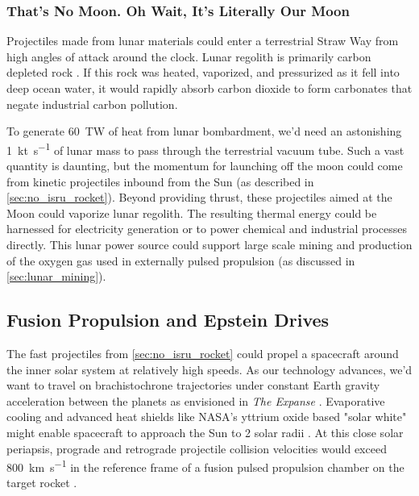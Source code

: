 \documentclass{article}
\begin{document}
\subsubsection{That's No Moon.  Oh Wait, It's Literally Our Moon}\cite{starwars1977}
Projectiles made from lunar materials could enter a terrestrial Straw Way from high angles of attack around the clock.  Lunar regolith is primarily carbon depleted rock \cite{mckay1991lunar}.  If this rock was heated, vaporized, and pressurized as it fell into deep ocean water, it would rapidly absorb carbon dioxide to form carbonates that  negate industrial carbon pollution.

To generate \SI{60}{\tera\watt} of heat from lunar bombardment, we'd need an astonishing \SI{1}{\kilo\tonne\per\second} of lunar mass to pass through the terrestrial vacuum tube. Such a vast quantity is daunting, but the momentum for launching off the moon could come from kinetic projectiles inbound from the Sun (as described in \autoref{sec:no_isru_rocket}). Beyond providing thrust, these projectiles aimed at the Moon could vaporize lunar regolith. The resulting thermal energy could be harnessed for electricity generation or to power chemical and industrial processes directly. This lunar power source could support large scale mining and production of the oxygen gas used in externally pulsed propulsion  (as discussed in \autoref{sec:lunar_mining}).

\subsection{Fusion Propulsion and Epstein Drives}\label{sec:epstein_drives}
The fast projectiles from \autoref{sec:no_isru_rocket} could propel a spacecraft around the inner solar system at relatively high speeds.   As our technology advances, we'd want to travel on brachistochrone trajectories under constant Earth gravity acceleration between the planets as envisioned in \textit{The Expanse} \cite{Corey2012Drive}.  Evaporative cooling and advanced heat shields like NASA's yttrium oxide based "solar white" might  enable spacecraft to approach the Sun to 2 solar radii \cite{ted_ed_2025_how_close}.  At this close solar periapsis, prograde and retrograde projectile collision velocities would exceed \SI{800}{\kilo\meter\per\second} in the reference frame of a fusion pulsed propulsion chamber on the target rocket \cite{ted_ed_2025_how_close}.  
\end{document}
